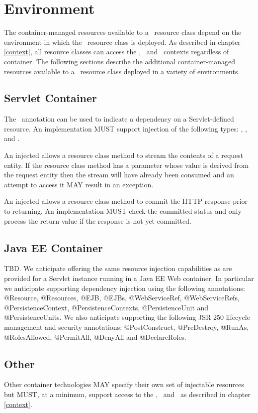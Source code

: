 \chapter{Environment}

The container-managed resources available to a \jaxrs\ resource class depend on the environment in which the \jaxrs\ resource class is deployed. As described in chapter \ref{context}, all resource classes can access the \UriInfo, \HttpHeaders\ and \PreconditionEvaluator\ contexts regardless of container. The following sections describe the additional container-managed resources available to a \jaxrs\ resource class deployed in a variety of environments.

\section{Servlet Container}

The \Resource\ annotation can be used to indicate a dependency on a Servlet-defined resource. An implementation MUST support injection of the following types: , ,  and .

An injected  allows a resource class method to stream the contents of a request entity. If the resource class method has a parameter whose value is derived from the request entity then the stream will have already been consumed and an attempt to access it MAY result in an exception.

An injected  allows a resource class method to commit the HTTP response prior to returning. An implementation MUST check the committed status and only process the return value if the response is not yet committed.

\section{Java EE Container}

\begin{ednote*}
TBD. We anticipate offering the same resource injection capabilities as are provided for a Servlet instance running in a Java EE Web container. In particular we anticipate supporting dependency injection using the following annotations: @Resource, @Resources, @EJB, @EJBs, @WebServiceRef, @WebServiceRefs, @PersistenceContext, @PersistenceContexts, @PersistenceUnit and @PersistenceUnits. We also anticipate supporting the following JSR 250 lifecycle management and security annotations:  @PostConstruct, @PreDestroy, @RunAs, @RolesAllowed, @PermitAll, @DenyAll and @DeclareRoles.
\end{ednote*}

\section{Other}

Other container technologies MAY specify their own set of injectable resources but MUST, at a minimum, support access to the \UriInfo, \HttpHeaders\ and \PreconditionEvaluator\ as described in chapter \ref{context}.